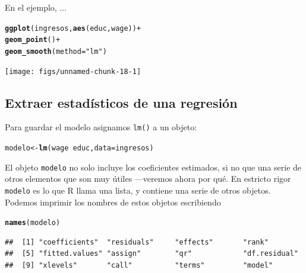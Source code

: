 \documentclass{report}\usepackage[]{graphicx}\usepackage[]{color}
\makeatletter
\newcommand{\hlstr}[1]{\textcolor[rgb]{0.192,0.494,0.8}{#1}}%
\newcommand{\hlopt}[1]{\textcolor[rgb]{0,0,0}{#1}}%
\newcommand{\hlstd}[1]{\textcolor[rgb]{0.345,0.345,0.345}{#1}}%
\newcommand{\hlkwb}[1]{\textcolor[rgb]{0.69,0.353,0.396}{#1}}%
\newcommand{\hlkwc}[1]{\textcolor[rgb]{0.333,0.667,0.333}{#1}}%
\newcommand{\hlkwd}[1]{\textcolor[rgb]{0.737,0.353,0.396}{\textbf{#1}}}%
\newenvironment{kframe}{%
 \def\at@end@of@kframe{}%
 \ifinner\ifhmode%
  \def\at@end@of@kframe{\end{minipage}}%
  \begin{minipage}{\columnwidth}%
 \fi\fi%
 \def\FrameCommand##1{\hskip\@totalleftmargin \hskip-\fboxsep
 \colorbox{shadecolor}{##1}\hskip-\fboxsep
     \hskip-\linewidth \hskip-\@totalleftmargin \hskip\columnwidth}%
 \MakeFramed {\advance\hsize-\width
   \@totalleftmargin\z@ \linewidth\hsize
   \@setminipage}}%
 {\par\unskip\endMakeFramed%
 \at@end@of@kframe}
\newenvironment{knitrout}{}{} %
\makeatother
\begin{document}
En el ejemplo, ...


\begin{knitrout}
\color{fgcolor}\begin{kframe}
\begin{alltt}
\hlkwd{ggplot}\hlstd{(ingresos,} \hlkwd{aes}\hlstd{(educ, wage))} \hlopt{+}
  \hlkwd{geom_point}\hlstd{()} \hlopt{+}
  \hlkwd{geom_smooth}\hlstd{(}\hlkwc{method} \hlstd{=} \hlstr{"lm"}\hlstd{)}
\end{alltt}
\end{kframe}

{\centering \texttt{[image: figs/unnamed-chunk-18-1]} 

}



\end{knitrout}


\subsection{Extraer estadísticos de una regresión}

Para guardar el modelo asignamos \verb|lm()| a un objeto:

\begin{knitrout}
\color{fgcolor}\begin{kframe}
\begin{alltt}
\hlstd{modelo} \hlkwb{<-} \hlkwd{lm}\hlstd{(wage} \hlopt{~} \hlstd{educ,} \hlkwc{data} \hlstd{= ingresos)}
\end{alltt}
\end{kframe}
\end{knitrout}

El objeto \verb|modelo| no solo incluye los coeficientes estimados, si no que una serie de otros elementos que son muy útiles ---veremos ahora por qué. En estricto rigor \verb|modelo| es lo que R llama una lista, y contiene una serie de otros objetos. Podemos imprimir los nombres de estos objetos escribiendo
\begin{knitrout}
\color{fgcolor}\begin{kframe}
\begin{alltt}
\hlkwd{names}\hlstd{(modelo)}
\end{alltt}
\begin{verbatim}
##  [1] "coefficients"  "residuals"     "effects"       "rank"         
##  [5] "fitted.values" "assign"        "qr"            "df.residual"  
##  [9] "xlevels"       "call"          "terms"         "model"
\end{verbatim}
\end{kframe}
\end{knitrout}
\end{document}
